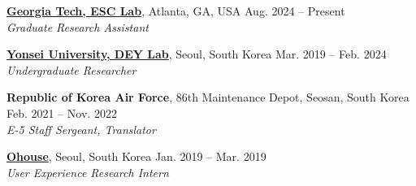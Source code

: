
\href{http://esc-lab.org}{\textbf{Georgia Tech, ESC Lab}}, Atlanta, GA, USA \hfill{Aug. 2024 -- Present}\\
\textit{Graduate Research Assistant}\\

\vspace{-0.25cm}

\noindent\href{http://www.deylabyonsei.com}{\textbf{Yonsei University, DEY Lab}}, Seoul, South Korea \hfill{Mar. 2019 -- Feb. 2024}\\
\textit{Undergraduate Researcher} \\
\vspace{-0.25cm}

\noindent\textbf{Republic of Korea Air Force}, 86th Maintenance Depot, Seosan, South Korea \hfill{Feb. 2021 -- Nov. 2022}\\
\textit{E-5 Staff Sergeant, Translator} \\

\vspace{-0.25cm}

\noindent\href{https://www.ohouse.com/en-US}{\textbf{Ohouse}}, Seoul, South Korea \hfill{Jan. 2019 -- Mar. 2019}\\
\textit{User Experience Research Intern} 